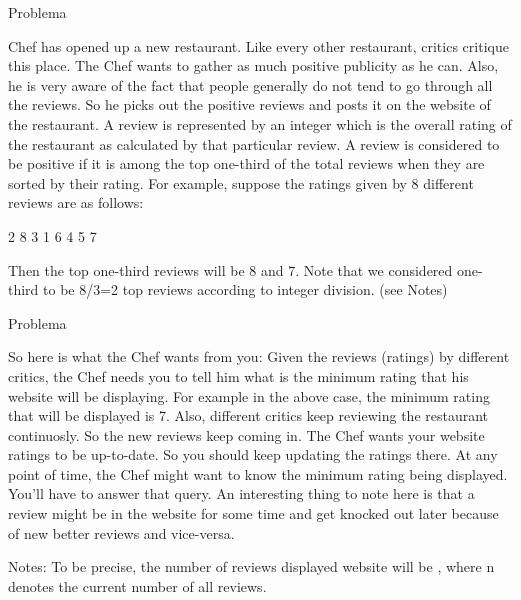 
\begin{frame}[fragile]{Problema}

Chef has opened up a new restaurant. Like every other restaurant, critics critique this place. The Chef wants to gather as much positive publicity as he can. Also, he is very aware of the fact that people generally do not tend to go through all the reviews. So he picks out the positive reviews and posts it on the website of the restaurant. A review is represented by an integer which is the overall rating of the restaurant as calculated by that particular review. A review is considered to be positive if it is among the top one-third of the total reviews when they are sorted by their rating. For example, suppose the ratings given by 8 different reviews are as follows:

2 8 3 1 6 4 5 7

Then the top one-third reviews will be 8 and 7. Note that we considered one-third to be 8/3=2 top reviews according to integer division. (see Notes)

\end{frame}

\begin{frame}[fragile]{Problema}

So here is what the Chef wants from you: Given the reviews (ratings) by different critics, the Chef needs you to tell him what is the minimum rating that his website will be displaying. For example in the above case, the minimum rating that will be displayed is 7. Also, different critics keep reviewing the restaurant continuosly. So the new reviews keep coming in. The Chef wants your website ratings to be up-to-date. So you should keep updating the ratings there. At any point of time, the Chef might want to know the minimum rating being displayed. You'll have to answer that query. An interesting thing to note here is that a review might be in the website for some time and get knocked out later because of new better reviews and vice-versa.

Notes: To be precise, the number of reviews displayed website will be , where n denotes the current number of all reviews.

\end{frame}

